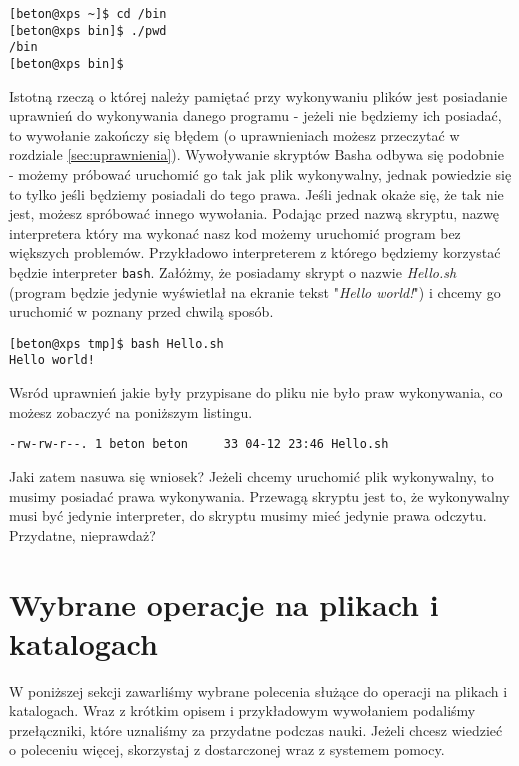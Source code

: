 \begin{verbatim}
[beton@xps ~]$ cd /bin
[beton@xps bin]$ ./pwd 
/bin
[beton@xps bin]$ 
\end{verbatim}
Istotną rzeczą o której należy pamiętać przy wykonywaniu plików jest posiadanie uprawnień do wykonywania danego programu - jeżeli nie będziemy ich posiadać, to wywołanie zakończy się błędem (o uprawnieniach możesz przeczytać w rozdziale \ref{sec:uprawnienia}).
\newline
\newline
Wywoływanie skryptów Basha odbywa się podobnie - możemy próbować uruchomić go tak jak plik wykonywalny, jednak powiedzie się to tylko jeśli będziemy posiadali do tego prawa. Jeśli jednak okaże się, że tak nie jest, możesz spróbować innego wywołania. Podając przed nazwą skryptu, nazwę interpretera który ma wykonać nasz kod możemy uruchomić program bez większych problemów. Przykładowo interpreterem z którego będziemy korzystać będzie interpreter \texttt{bash}. Załóżmy, że posiadamy skrypt o nazwie \textit{Hello.sh} (program będzie jedynie wyświetlał na ekranie tekst 
"\textit{Hello world!}") i chcemy go uruchomić w poznany przed chwilą sposób.
\begin{verbatim}
[beton@xps tmp]$ bash Hello.sh 
Hello world!
\end{verbatim} 
Wsród uprawnień jakie były przypisane do pliku nie było praw wykonywania, co możesz zobaczyć na poniższym listingu.
\begin{verbatim}
-rw-rw-r--. 1 beton beton     33 04-12 23:46 Hello.sh
\end{verbatim}
Jaki zatem nasuwa się wniosek? Jeżeli chcemy uruchomić plik wykonywalny, to musimy posiadać prawa wykonywania. Przewagą skryptu jest to, że wykonywalny musi być jedynie interpreter, do skryptu musimy mieć jedynie prawa odczytu. Przydatne, nieprawdaż?

\section{Wybrane operacje na plikach i katalogach}
W poniższej sekcji zawarliśmy wybrane polecenia służące do operacji na plikach i katalogach. Wraz z krótkim opisem i przykładowym wywołaniem podaliśmy przełączniki, które uznaliśmy za przydatne podczas nauki. Jeżeli chcesz wiedzieć o poleceniu więcej, skorzystaj z dostarczonej wraz z systemem pomocy.

